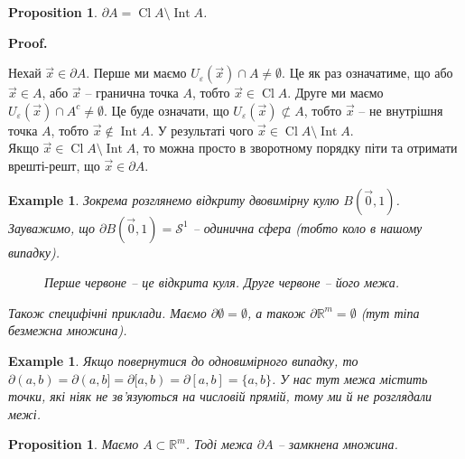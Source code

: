 \documentclass[a4paper, 10pt]{article}
\makeatletter
\theoremstyle{theoremdd}
\theoremstyle{theoremdd}
\theoremstyle{theoremdd}
\theoremstyle{theoremdd}
\theoremstyle{theoremdd}
\newtheorem{example}[theorem]{Example}
\theoremstyle{theoremdd}
\newtheorem{proposition}[theorem]{Proposition}
\theoremstyle{theoremdd}
\theoremstyle{theoremdd}
\theoremstyle{theoremdd}
\renewenvironment{proof}[1][Proof.\\]{\par
\pushQED{\hfill \qed}%
\normalfont \topsep6\p@\@plus6\p@\relax
\trivlist
\item\relax
{\bfseries
#1\@addpunct{.}}\hspace\labelsep\ignorespaces
}{%
\popQED\endtrivlist\@endpefalse
}
\DeclareMathOperator{\Cl}{Cl}
\DeclareMathOperator{\Int}{Int}
\makeatother
\begin{document}
\begin{proposition}
$\partial A = \Cl A \setminus \Int A$.
\end{proposition}

\begin{proof}
Нехай $\vec{x} \in \partial A$. Перше ми маємо $U_\varepsilon(\vec{x}) \cap A \neq \emptyset$. Це як раз означатиме, що або $\vec{x} \in A$, або $\vec{x}$ -- гранична точка $A$, тобто $\vec{x} \in \Cl A$. Друге ми маємо $U_\varepsilon(\vec{x}) \cap A^c \neq \emptyset$. Це буде означати, що $U_\varepsilon(\vec{x}) \not\subset A$, тобто $\vec{x}$ -- не внутрішня точка $A$, тобто $\vec{x} \notin \Int A$. У результаті чого $\vec{x} \in \Cl A \setminus \Int A$.\\
Якщо $\vec{x} \in \Cl A \setminus \Int A$, то можна просто в зворотному порядку піти та отримати врешті-решт, що $\vec{x} \in \partial A$.
\end{proof}

\begin{example}
Зокрема розглянемо відкриту двовимірну кулю $B(\vec{0},1)$. Зауважимо, що $\partial B(\vec{0},1) = \mathcal{S}^1$ -- одинична сфера (тобто коло в нашому випадку).
\begin{figure}[H]
\centering
{}
\qquad
{}
\caption*{Перше червоне -- це відкрита куля. Друге червоне -- його межа.}
\end{figure}
Також специфічні приклади. Маємо $\partial \emptyset = \emptyset$, а також $\partial \mathbb{R}^m = \emptyset$ (тут тіпа безмежна множина).
\end{example}

\begin{example}
Якщо повернутися до одновимірного випадку, то $\partial (a,b) = \partial (a,b] = \partial [a,b) = \partial [a,b] = \{a,b\}$. У нас тут межа містить точки, які ніяк не зв'язуються на числовій прямій, тому ми й не розглядали межі.
\end{example}

\begin{proposition}
Маємо $A \subset \mathbb{R}^m$. Тоді межа $\partial A$ -- замкнена множина.
\end{proposition}
\end{document}
